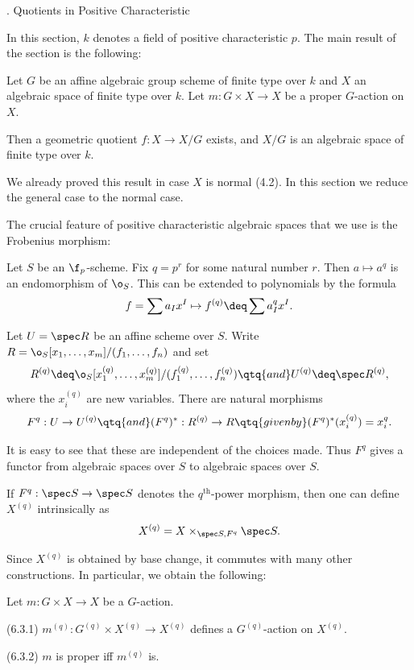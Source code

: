 . Quotients in Positive Characteristic
\endhead

In this section, $k$  denotes a field of positive characteristic $p$.
The main result of the section is the following:

 Let  $G$ be an affine
algebraic group scheme   of finite type over $k$ and $X$ an algebraic
space  of finite type over $k$. Let $m:G\times X\to X$ be a proper $G$-action
on $X$.

Then a geometric quotient $f:X\to X/G$ exists, and $X/G$ is an
algebraic
space  of finite type over $k$.
\endproclaim

We already proved this result in case $X$ is   normal (4.2). In this
section we reduce the general case to the   normal case.


The crucial feature of positive characteristic algebraic spaces that we
use is the Frobenius morphism:


Let $S$ be an $\f_p$-scheme.
Fix $q=p^r$ for some natural number $r$. Then $a\mapsto a^q$ is an
endomorphism of $\o_S$. This can be extended to polynomials
by the formula
$$
f=\sum a_Ix^I\mapsto f^{(q)}\deq \sum a^q_Ix^I.
$$

Let $U=\spec R$ be an affine scheme over $S$. Write
$R=\o_S[x_1,\dots,x_m]/(f_1,\dots,f_n)$ and set
$$
R^{(q)}\deq \o_S[x^{(q)}_1,\dots,x^{(q)}_m]/(f^{(q)}_1,\dots,f^{(q)}_n)
\qtq{and}  U^{(q)}\deq
\spec R^{(q)},
$$
where the $x^{(q)}_i$ are new variables.
There are natural morphisms
$$
F^q:U\to U^{(q)}\qtq{and} (F^q)^*:R^{(q)}\to R\qtq{given by}
(F^q)^*(x^{(q)}_i)=x_i^q.
$$

It is easy to see that these are independent of the choices made. Thus $F^q$
gives a functor from algebraic spaces over $S$  to algebraic spaces over
 $S$.

If $F^q:\spec S\to \spec S$ denotes the $q^{\text{th}}$-power morphism, then
one can define $X^{(q)}$ intrinsically as
$$
X^{(q)}=X\times_{\spec S,F^q}\spec S.
$$
\enddemo

Since $X^{(q)}$ is obtained by base change,  it commutes with many other
constructions. In particular, we obtain the following:


 Let $m:G\times X\to X$ be a $G$-action.

(6.3.1) $m^{(q)}:G^{(q)}\times X^{(q)}\to X^{(q)}$ defines a $G^{(q)}$-action
on $X^{(q)}$.

(6.3.2) $m$ is proper iff $m^{(q)}$ is.

